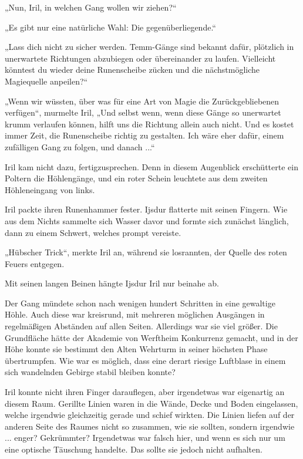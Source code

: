 „Nun, Iril, in welchen Gang wollen wir ziehen?“

„Es gibt nur eine natürliche Wahl: Die gegenüberliegende.“

„Lass dich nicht zu sicher werden. Temm-Gänge sind bekannt dafür, plötzlich in unerwartete Richtungen abzubiegen oder übereinander zu laufen. Vielleicht könntest du wieder deine Runenscheibe zücken und die nächstmögliche Magiequelle anpeilen?“

„Wenn wir wüssten, über was für eine Art von Magie die Zurückgebliebenen verfügen“, murmelte Iril, „Und selbst wenn, wenn diese Gänge so unerwartet krumm verlaufen können, hilft uns die Richtung allein auch nicht. Und es kostet immer Zeit, die Runenscheibe richtig zu gestalten. Ich wäre eher dafür, einem zufälligen Gang zu folgen, und danach ...“

Iril kam nicht dazu, fertigzusprechen. Denn in diesem Augenblick erschütterte ein Poltern die Höhlengänge, und ein roter Schein leuchtete aus dem zweiten Höhleneingang von links.

Iril packte ihren Runenhammer fester. Ijsdur flatterte mit seinen Fingern. Wie aus dem Nichts sammelte sich Wasser davor und formte sich zunächst länglich, dann zu einem Schwert, welches prompt vereiste.

„Hübscher Trick“, merkte Iril an, während sie losrannten, der Quelle des roten Feuers entgegen.

Mit seinen langen Beinen hängte Ijsdur Iril nur beinahe ab.



\trennzeichen



Der Gang mündete schon nach wenigen hundert Schritten in eine gewaltige Höhle. Auch diese war kreisrund, mit mehreren möglichen Ausgängen in regelmäßigen Abständen auf allen Seiten. Allerdings war sie viel größer. Die Grundfläche hätte der Akademie von Werftheim Konkurrenz gemacht, und in der Höhe konnte sie bestimmt den Alten Wehrturm in seiner höchsten Phase übertrumpfen. Wie war es möglich, dass eine derart riesige Luftblase in einem sich wandelnden Gebirge stabil bleiben konnte?

Iril konnte nicht ihren Finger darauflegen, aber irgendetwas war eigenartig an diesem Raum. Gerillte Linien waren in die Wände, Decke und Boden eingelassen, welche irgendwie gleichzeitig gerade und schief wirkten. Die Linien liefen auf der anderen Seite des Raumes nicht so zusammen, wie sie sollten, sondern irgendwie ... enger? Gekrümmter? Irgendetwas war falsch hier, und wenn es sich nur um eine optische Täuschung handelte. Das sollte sie jedoch nicht aufhalten.

